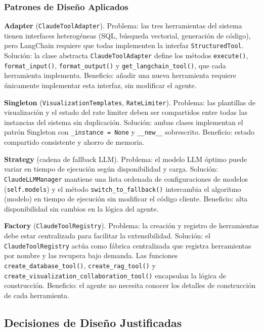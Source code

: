 \subsubsection{Patrones de Diseño Aplicados}

\textbf{Adapter} (\texttt{ClaudeToolAdapter}). Problema: las tres herramientas del sistema tienen interfaces heterogéneas (SQL, búsqueda vectorial, generación de código), pero LangChain requiere que todas implementen la interfaz \texttt{StructuredTool}. Solución: la clase abstracta \texttt{ClaudeToolAdapter} define los métodos \texttt{execute()}, \texttt{format\_input()}, \texttt{format\_output()} y \texttt{get\_langchain\_tool()}, que cada herramienta implementa. Beneficio: añadir una nueva herramienta requiere únicamente implementar esta interfaz, sin modificar el agente.

\textbf{Singleton} (\texttt{VisualizationTemplates}, \texttt{RateLimiter}). Problema: las plantillas de visualización y el estado del rate limiter deben ser compartidos entre todas las instancias del sistema sin duplicación. Solución: ambas clases implementan el patrón Singleton con \texttt{\_instance = None} y \texttt{\_\_new\_\_} sobrescrito. Beneficio: estado compartido consistente y ahorro de memoria.

\textbf{Strategy} (cadena de fallback LLM). Problema: el modelo LLM óptimo puede variar en tiempo de ejecución según disponibilidad y carga. Solución: \texttt{ClaudeLLMManager} mantiene una lista ordenada de configuraciones de modelos (\texttt{self.models}) y el método \texttt{switch\_to\_fallback()} intercambia el algoritmo (modelo) en tiempo de ejecución sin modificar el código cliente. Beneficio: alta disponibilidad sin cambios en la lógica del agente.

\textbf{Factory} (\texttt{ClaudeToolRegistry}). Problema: la creación y registro de herramientas debe estar centralizada para facilitar la extensibilidad. Solución: el \texttt{ClaudeToolRegistry} actúa como fábrica centralizada que registra herramientas por nombre y las recupera bajo demanda. Las funciones \texttt{create\_database\_tool()}, \texttt{create\_rag\_tool()} y \texttt{create\_visualization\_collaboration\_tool()} encapsulan la lógica de construcción. Beneficio: el agente no necesita conocer los detalles de construcción de cada herramienta.

\subsection{Decisiones de Diseño Justificadas}
\label{sec:decisiones_diseno}

